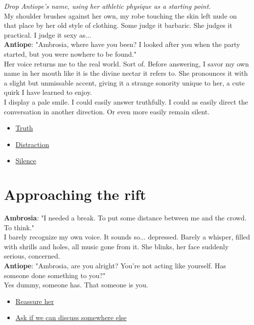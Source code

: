 \documentclass{report}
\newcommand{\dcomment}[1]{
	\emph{#1}
	\\
}
\newcommand{\speaker}[1]{
	\textbf{#1}: 
}
\newcommand{\glink}[2]{
	\hyperref[#1]{#2}
}
\newcommand{\gsection}[1]{
	\section*{#1}
	\label{#1}
}
\begin{document}
\dcomment{
	Drop Antiope's name, using her athletic physique as a starting point.
}

My shoulder brushes against her own, my robe touching the skin left nude on that place by her old style of clothing. Some judge it barbaric. She judges it practical. I judge it sexy as...\\

\speaker{Antiope} "Ambrosia, where have you been? I looked after you when the party started, but you were nowhere to be found."\\

Her voice returns me to the real world. Sort of. Before answering, I savor my own name in her mouth like it is the divine nectar it refers to. She pronounces it with a slight but unmissable accent, giving it a strange sonority unique to her, a cute quirk I have learned to enjoy.\\

I display a pale smile. I could easily answer truthfully. I could as easily direct the conversation in another direction. Or even more easily remain silent.

\begin{itemize}
	\item \glink{Approaching the rift}{Truth}
	\item \glink{Sport}{Distraction}
	\item \glink{Silence}{Silence}
\end{itemize}

\gsection{Approaching the rift}

\speaker{Ambrosia} "I needed a break. To put some distance between me and the crowd. To think."\\

I barely recognize my own voice. It sounds so... depressed. Barely a whisper, filled with shrills and holes, all music gone from it. She blinks, her face suddenly serious, concerned.\\

\speaker{Antiope} "Ambrosia, are you alright? You're not acting like yourself. Has someone done something to you?"\\

Yes dummy, someone has. That someone is you.

\begin{itemize}
	\item \glink{It's nothing}{Reassure her}
	\item \glink{The garden}{Ask if we can discuss somewhere else}
\end{itemize}
\end{document}

